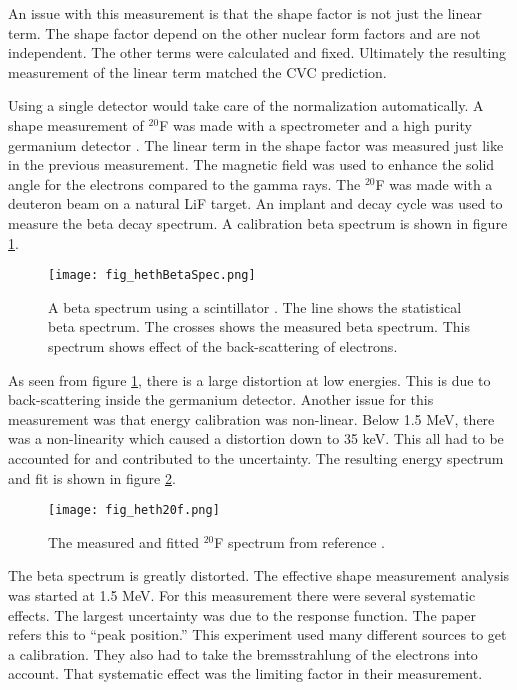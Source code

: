 \documentclass[../MaxHughesThesis.tex]{subfiles}
\begin{document}
An issue with this measurement is that the shape factor is not just the linear term.
The shape factor depend on the other nuclear form factors and are not independent.
The other terms were calculated and fixed.
Ultimately the resulting measurement of the linear term matched the CVC prediction.

Using a single detector would take care of the normalization automatically. 
A shape measurement of $^{20}$F was made with a spectrometer and a high purity germanium detector \cite{Het89}.
The linear term in the shape factor was measured just like in the previous measurement.
The magnetic field was used to enhance the solid angle for the electrons compared to the gamma rays.
The $^{20}$F was made with a deuteron beam on a natural LiF target. 
An implant and decay cycle was used to measure the beta decay spectrum. 
A calibration beta spectrum is shown in figure \ref{fig:hethspec}.

\begin{figure}[!htb]
	\centerline{\texttt{[image: fig\_hethBetaSpec.png]}}
	\caption{A beta spectrum using a scintillator \cite{Het89}.
		    The line shows the statistical beta spectrum.
		    The crosses shows the measured beta spectrum.
		    This spectrum shows effect of the back-scattering of electrons.}
	\label{fig:hethspec}
\end{figure}

As seen from figure \ref{fig:hethspec}, there is a large distortion at low energies.
This is due to back-scattering inside the germanium detector.
Another issue for this measurement was that energy calibration was non-linear.
Below 1.5 MeV, there was a non-linearity which caused a distortion down to 35 keV. 
This all had to be accounted for and contributed to the uncertainty.
The resulting energy spectrum and fit is shown in figure \ref{fig:heth20Fspec}.

\begin{figure}[!htb]
	\centerline{\texttt{[image: fig\_heth20f.png]}}
	\caption{The measured and fitted $^{20}$F spectrum from reference \cite{Het89}.}
	\label{fig:heth20Fspec}
\end{figure}

The beta spectrum is greatly distorted.
The effective shape measurement analysis was started at 1.5 MeV.
For this measurement there were several systematic effects.
The largest uncertainty was due to the response function.
The paper refers this to ``peak position.'' 
This experiment used many different sources to get a calibration.
They also had to take the bremsstrahlung of the electrons into account.
That systematic effect was the limiting factor in their measurement.
\end{document}
